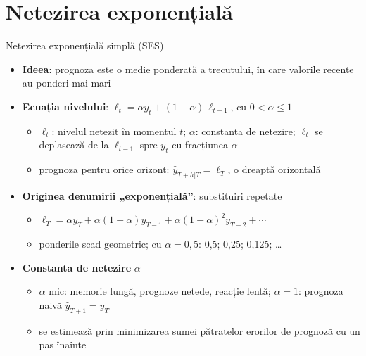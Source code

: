 \section{Netezirea exponențială}

\begin{frame}{Netezirea exponențială simplă (SES)}
\itemsize{\small}
\begin{itemize}
    \item \textbf{Ideea}: prognoza este o medie ponderată a trecutului, în care valorile recente au ponderi mai mari
    \item \textbf{Ecuația nivelului}: $\ell_t = \alpha y_t + (1 - \alpha)\, \ell_{t-1}$, cu $0 < \alpha \le 1$
    \begin{itemize}
        \item $\ell_t$: nivelul netezit în momentul $t$; $\alpha$: constanta de netezire; $\ell_t$ se deplasează de la $\ell_{t-1}$ spre $y_t$ cu fracțiunea $\alpha$
        \item prognoza pentru orice orizont: $\hat y_{T+h|T} = \ell_T$, o dreaptă orizontală
    \end{itemize}
    \item \textbf{Originea denumirii „exponențială”}: substituiri repetate
    \begin{itemize}
        \item $\ell_T = \alpha y_T + \alpha(1-\alpha) y_{T-1} + \alpha(1-\alpha)^2 y_{T-2} + \cdots$
        \item ponderile scad geometric; cu $\alpha = 0{,}5$: 0,5; 0,25; 0,125; \ldots
    \end{itemize}
    \item \textbf{Constanta de netezire} $\alpha$
    \begin{itemize}
        \item $\alpha$ mic: memorie lungă, prognoze netede, reacție lentă; $\alpha = 1$: prognoza naivă $\hat y_{T+1} = y_T$
        \item se estimează prin minimizarea sumei pătratelor erorilor de prognoză cu un pas înainte
    \end{itemize}
\end{itemize}
\end{frame}

